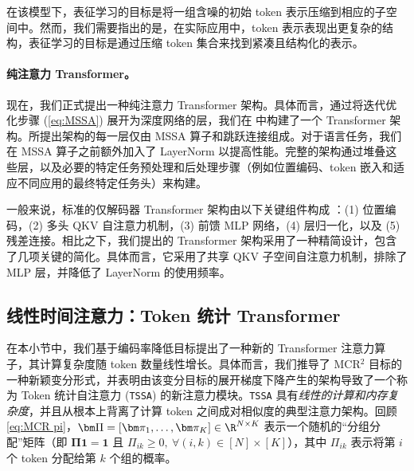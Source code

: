 \documentclass[../../book-main_zh.tex]{subfiles}
\begin{document}
\begin{remark}
    在该模型下，表征学习的目标是将一组含噪的初始 token 表示压缩到相应的子空间中。然而，我们需要指出的是，在实际应用中，token 表示表现出更复杂的结构，表征学习的目标是通过压缩 token 集合来找到紧凑且结构化的表示。
\end{remark}

\paragraph{纯注意力 Transformer。} 现在，我们正式提出一种纯注意力 Transformer 架构。具体而言，通过将迭代优化步骤 (\ref{eq:MSSA}) 展开为深度网络的层，我们在  中构建了一个 Transformer 架构。所提出架构的每一层仅由 MSSA 算子和跳跃连接组成。对于语言任务，我们在 MSSA 算子之前额外加入了 LayerNorm 以提高性能。完整的架构通过堆叠这些层，以及必要的特定任务预处理和后处理步骤（例如位置编码、token 嵌入和适应不同应用的最终特定任务头）来构建。

一般来说，标准的仅解码器 Transformer 架构由以下关键组件构成 \cite{vaswani2017attention}：(1) 位置编码，(2) 多头 QKV 自注意力机制，(3) 前馈 MLP 网络，(4) 层归一化，以及 (5) 残差连接。相比之下，我们提出的 Transformer 架构采用了一种精简设计，包含了几项关键的简化。具体而言，它采用了共享 QKV 子空间自注意力机制，排除了 MLP 层，并降低了 LayerNorm 的使用频率。

\subsection{线性时间注意力：Token 统计 Transformer}\label{sub:tost}

在本小节中，我们基于编码率降低目标提出了一种新的 Transformer 注意力算子，其计算复杂度随 token 数量线性增长。具体而言，我们推导了 MCR$^2$ 目标的一种新颖变分形式，并表明由该变分目标的展开梯度下降产生的架构导致了一个称为 Token 统计自注意力 (\texttt{TSSA}) 的新注意力模块。\texttt{TSSA} 具有{\em 线性的计算和内存复杂度}，并且从根本上背离了计算 token 之间成对相似度的典型注意力架构。回顾 \eqref{eq:MCR pi}，$\bm \Pi = [\bm \pi_1, \ldots, \bm \pi_K] \in \R^{N \times K}$ 表示一个随机的“分组分配”矩阵（即 $\bm \Pi \bm
    1 = \bm 1$ 且 $\Pi_{ik} \geq 0, \  \forall (i,k) \in [N] \times [K]$），其中 $\Pi_{ik}$ 表示将第 $i$ 个 token 分配给第 $k$ 个组的概率。
\end{document}
